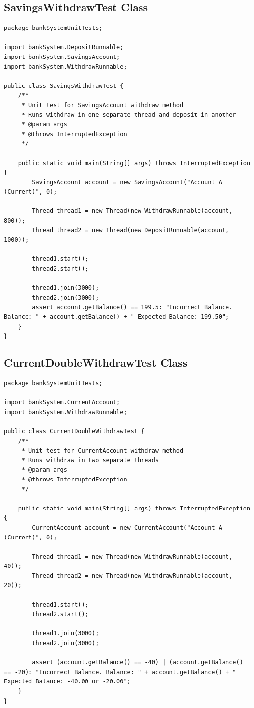 \documentclass[a4paper,12pt]{article}
\begin{document}
\subsection{SavingsWithdrawTest Class} \label{appendix:SavingsWithdraw}

\begin{lstlisting}
package bankSystemUnitTests;

import bankSystem.DepositRunnable;
import bankSystem.SavingsAccount;
import bankSystem.WithdrawRunnable;

public class SavingsWithdrawTest {
    /**
     * Unit test for SavingsAccount withdraw method
     * Runs withdraw in one separate thread and deposit in another
     * @param args
     * @throws InterruptedException
     */

    public static void main(String[] args) throws InterruptedException {
        SavingsAccount account = new SavingsAccount("Account A (Current)", 0);

        Thread thread1 = new Thread(new WithdrawRunnable(account, 800));
        Thread thread2 = new Thread(new DepositRunnable(account, 1000));

        thread1.start();
        thread2.start();

        thread1.join(3000);
        thread2.join(3000);
        assert account.getBalance() == 199.5: "Incorrect Balance. Balance: " + account.getBalance() + " Expected Balance: 199.50";
    }
}
\end{lstlisting}

\subsection{CurrentDoubleWithdrawTest Class} \label{appendix:CurrentDoubleWithdraw}

\begin{lstlisting}
package bankSystemUnitTests;

import bankSystem.CurrentAccount;
import bankSystem.WithdrawRunnable;

public class CurrentDoubleWithdrawTest {
    /**
     * Unit test for CurrentAccount withdraw method
     * Runs withdraw in two separate threads
     * @param args
     * @throws InterruptedException
     */

    public static void main(String[] args) throws InterruptedException {
        CurrentAccount account = new CurrentAccount("Account A (Current)", 0);

        Thread thread1 = new Thread(new WithdrawRunnable(account, 40));
        Thread thread2 = new Thread(new WithdrawRunnable(account, 20));

        thread1.start();
        thread2.start();

        thread1.join(3000);
        thread2.join(3000);

        assert (account.getBalance() == -40) | (account.getBalance() == -20): "Incorrect Balance. Balance: " + account.getBalance() + " Expected Balance: -40.00 or -20.00";
    }
}
\end{lstlisting}
\end{document}
